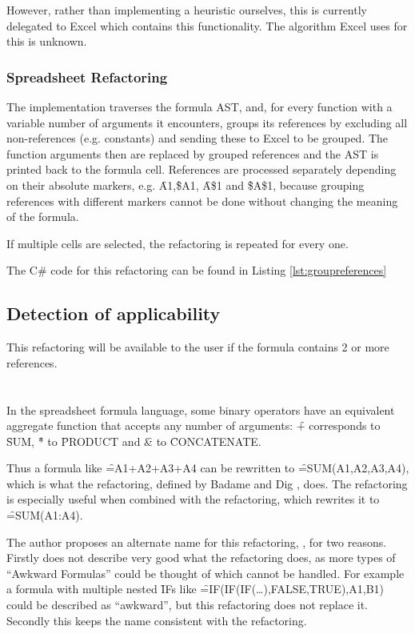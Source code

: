 However, rather than implementing a heuristic ourselves, this is currently delegated to Excel which contains this functionality.
The algorithm Excel uses for this is unknown.

\subsubsection{Spreadsheet Refactoring}

The implementation traverses the formula AST, and, for every function with a variable number of arguments it encounters, groups its references by excluding all non-references (e.g. constants) and sending these to Excel to be grouped.
The function arguments then are replaced by grouped references and the AST is printed back to the formula cell.
References are processed separately depending on their absolute markers, e.g. \f{A1},\f{\$A1}, \f{A\$1} and \f{\$A\$1}, because grouping references with different markers cannot be done without changing the meaning of the formula.

If multiple cells are selected, the refactoring is repeated for every one.

The C\# code for this refactoring can be found in Listing \ref{lst:groupreferences}

\subsection{Detection of applicability}

This refactoring will be available to the user if the formula contains 2 or more references.

\section{}
\label{refac:introduceaggregate}

In the spreadsheet formula language, some binary operators have an equivalent aggregate function that accepts any number of arguments: \f{+} corresponds to \f{SUM}, \f{*} to \f{PRODUCT} and \f{\&} to \f{CONCATENATE}.

Thus a formula like \f{=A1+A2+A3+A4} can be rewritten to \f{=SUM(A1,A2,A3,A4)}, which is what the  refactoring, defined by Badame and Dig \cite{badame2012refactoring}, does.
The refactoring is especially useful when combined with the  refactoring, which rewrites it to \f{=SUM(A1:A4)}.

The author proposes an alternate name for this refactoring, , for two reasons.
Firstly  does not describe very good what the refactoring does, as more types of ``Awkward Formulas'' could be thought of which cannot be handled.
For example a formula with multiple nested \f{IF}s like \f{=IF(IF(IF(\ldots),FALSE,TRUE),A1,B1)} could be described as ``awkward'', but this refactoring does not replace it.
Secondly this keeps the name consistent with the  refactoring.

